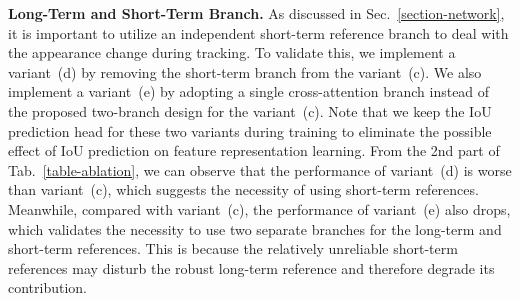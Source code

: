 \documentclass[runningheads]{llncs}
\begin{document}
\noindent\textbf{Long-Term and Short-Term Branch.} As discussed in Sec.~\ref{section-network}, it is important to utilize an independent short-term reference branch to deal with the appearance change during tracking. To validate this, we implement a variant~(d) by removing the short-term branch from the variant~(c). We also implement a variant~(e) by adopting a single cross-attention branch instead of the proposed two-branch design for the variant~(c). Note that we keep the IoU prediction head for these two variants during training to eliminate the possible effect of IoU prediction on feature representation learning. From the 2nd part of Tab.~\ref{table-ablation}, we can observe that the performance of variant~(d) is worse than variant~(c), which suggests the necessity of using short-term references. Meanwhile, compared with variant~(c), the performance of variant~(e) also drops, which validates the necessity to use two separate branches for the long-term and short-term references. This is because the relatively unreliable short-term references may disturb the robust long-term reference and therefore degrade its contribution.
\end{document}
